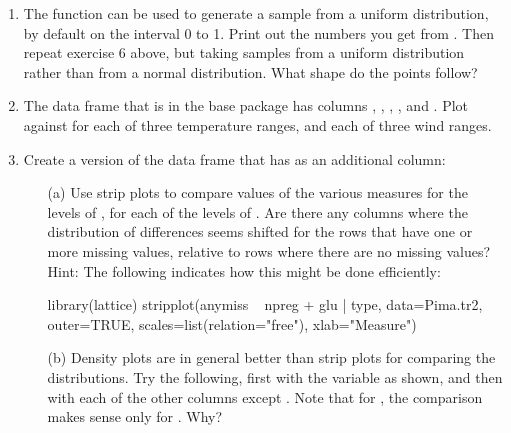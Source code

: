 \begin{enumerate}
\item The function  can be used to generate a sample
  from a uniform distribution, by default on the interval 0 to
  1. Print out the numbers you get from . Then repeat exercise 6 above, but taking samples from
  a uniform distribution rather than from a normal distribution.  What
  shape do the points follow?

\item The data frame  that is in the base package has
  columns , , ,
  ,  and . Plot
   against  for each of three
  temperature ranges, and each of three wind ranges.
\item Create a version of the data frame  that has
   as an additional column:
\begin{Schunk}
\end{Schunk}
\begin{itemize}
\item[(a)] Use strip plots to compare values of the various measures for
the levels of , for each of the levels of .
  Are there any columns where the distribution of differences seems
  shifted for the rows that have one or more missing values, relative
  to rows where there are no missing values?\newline Hint: The
  following indicates how this might be done efficiently:
\begin{fullwidth}

\begin{Schunk}
\begin{Sinput}
library(lattice)
stripplot(anymiss ~ npreg + glu | type, data=Pima.tr2, outer=TRUE,
          scales=list(relation="free"), xlab="Measure")
\end{Sinput}
\end{Schunk}

\end{fullwidth}
\item[(b)] Density plots are in general better than strip plots for
  comparing the distributions. Try the following, first with the
  variable  as shown, and then with each of the other
  columns except . Note that for , the comparison
  makes sense only for . Why?
\begin{fullwidth}


\end{fullwidth}
\end{itemize}
\end{enumerate}
